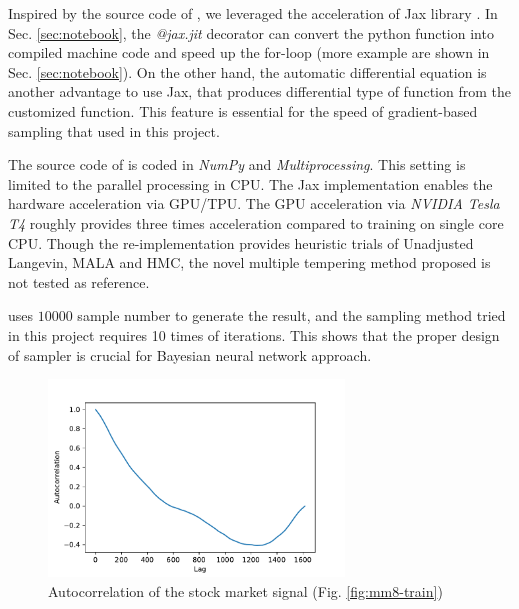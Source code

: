 \documentclass{article}
\begin{document}
Inspired by the source code of \cite{chandra2021bayesian}, we leveraged the acceleration of Jax library \citep{jax2018github}. In Sec. \ref{sec:notebook}, the \textit{@jax.jit} decorator can convert the python function into compiled machine code and speed up the for-loop (more example are shown in Sec. \ref{sec:notebook}). On the other hand, the automatic differential equation is another advantage to use Jax, that produces differential type of function from the customized function. This feature is essential for the speed of gradient-based sampling that used in this project. 

The source code of \cite{chandra2021bayesian} is coded in \textit{NumPy} and \textit{Multiprocessing}. This setting is limited to the parallel processing in CPU. The Jax implementation enables the hardware acceleration via GPU/TPU. The GPU acceleration via \textit{NVIDIA Tesla T4} roughly provides three times acceleration compared to training on single core CPU. Though the re-implementation provides heuristic trials of Unadjusted Langevin, MALA and HMC, the novel multiple tempering method proposed \citep{chandra2019langevin} is not tested as reference.

\cite{chandra2021bayesian} uses $10000$ sample number to generate the result, and the sampling method tried in this project requires 10 times of iterations. This shows that the proper design of sampler is crucial for Bayesian neural network approach.





\begin{figure}[htb]
    \centering
    \includegraphics[width=0.7\textwidth]{../img/autocorrelation.pdf}
    \caption{Autocorrelation of the stock market signal (Fig. \ref{fig:mm8-train})}
    \label{fig:auto}
\end{figure}



\end{document}
